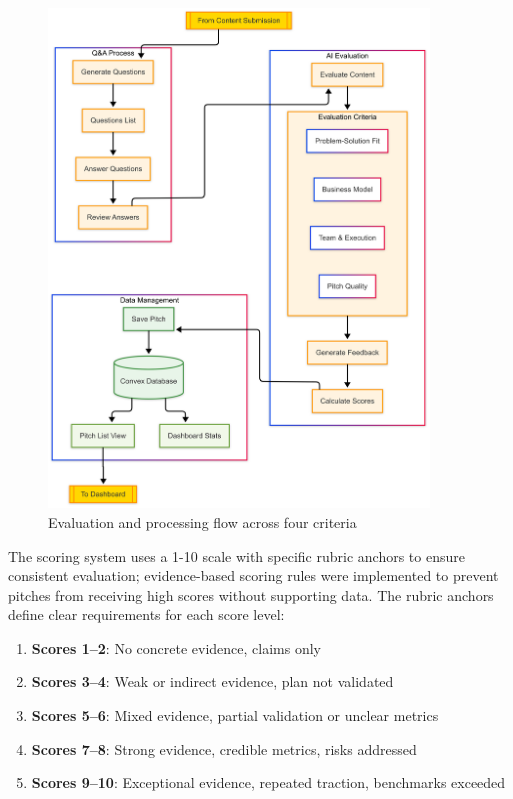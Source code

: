 \begin{figure}[H]
  \centering
  \includegraphics[width=0.9\textwidth]{img/eval-flow}
\caption{Evaluation and processing flow across four criteria}
  \label{fig:eval-flow}
\end{figure}

The scoring system uses a 1-10 scale with specific rubric anchors to ensure consistent evaluation; evidence-based scoring rules were implemented to prevent pitches from receiving high scores without supporting data. The rubric anchors define clear requirements for each score level:

\begin{enumerate}
    \item \textbf{Scores 1--2}: No concrete evidence, claims only
    \item \textbf{Scores 3--4}: Weak or indirect evidence, plan not validated
    \item \textbf{Scores 5--6}: Mixed evidence, partial validation or unclear metrics
    \item \textbf{Scores 7--8}: Strong evidence, credible metrics, risks addressed
    \item \textbf{Scores 9--10}: Exceptional evidence, repeated traction, benchmarks exceeded
\end{enumerate}


